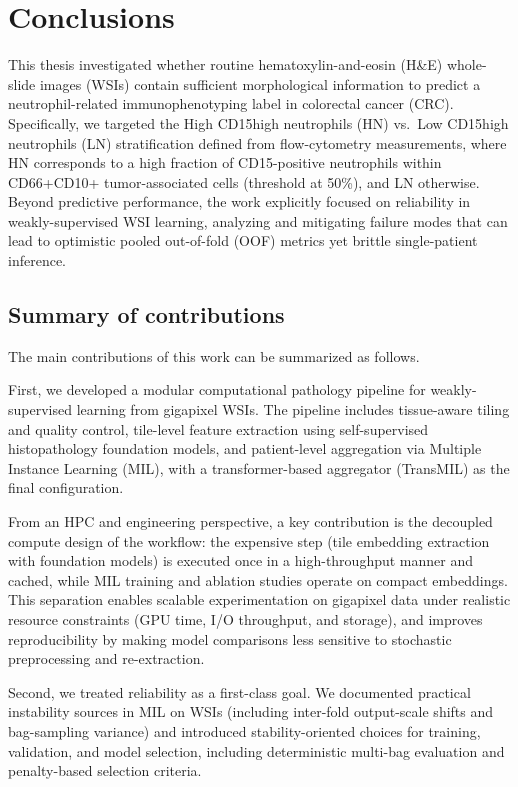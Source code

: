 \chapter{Conclusions}
\label{ch:conclusions}

This thesis investigated whether routine hematoxylin-and-eosin (H\&E) whole-slide images (WSIs) contain sufficient morphological information to predict a neutrophil-related immunophenotyping label in colorectal cancer (CRC). Specifically, we targeted the High CD15high neutrophils (HN) vs.\ Low CD15high neutrophils (LN) stratification defined from flow-cytometry measurements, where HN corresponds to a high fraction of CD15-positive neutrophils within CD66+CD10+ tumor-associated cells (threshold at 50\%), and LN otherwise.
Beyond predictive performance, the work explicitly focused on reliability in weakly-supervised WSI learning, analyzing and mitigating failure modes that can lead to optimistic pooled out-of-fold (OOF) metrics yet brittle single-patient inference.

\section{Summary of contributions}
The main contributions of this work can be summarized as follows.

First, we developed a modular computational pathology pipeline for weakly-supervised learning from gigapixel WSIs. The pipeline includes tissue-aware tiling and quality control, tile-level feature extraction using self-supervised histopathology foundation models, and patient-level aggregation via Multiple Instance Learning (MIL), with a transformer-based aggregator (TransMIL) as the final configuration.

From an HPC and engineering perspective, a key contribution is the decoupled compute design of the workflow: the expensive step (tile embedding extraction with foundation models) is executed once in a high-throughput manner and cached, while MIL training and ablation studies operate on compact embeddings. This separation enables scalable experimentation on gigapixel data under realistic resource constraints (GPU time, I/O throughput, and storage), and improves reproducibility by making model comparisons less sensitive to stochastic preprocessing and re-extraction.


Second, we treated reliability as a first-class goal. We documented practical instability sources in MIL on WSIs (including inter-fold output-scale shifts and bag-sampling variance) and introduced stability-oriented choices for training, validation, and model selection, including deterministic multi-bag evaluation and penalty-based selection criteria.

